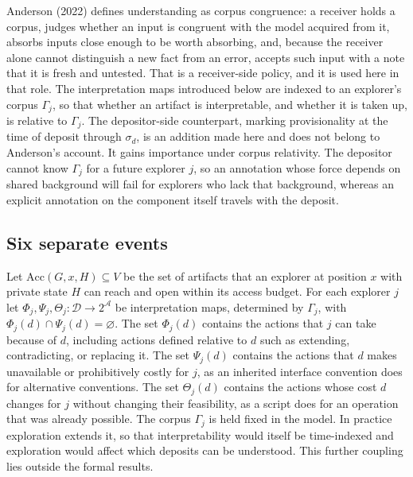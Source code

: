 \documentclass[11pt]{article}
\theoremstyle{definition}
\theoremstyle{remark}
\newcommand{\Acc}{\mathrm{Acc}}
\begin{document}
Anderson (2022) defines understanding as corpus congruence: a receiver holds a corpus, judges whether an input is congruent with the model acquired from it, absorbs inputs close enough to be worth absorbing, and, because the receiver alone cannot distinguish a new fact from an error, accepts such input with a note that it is fresh and untested. That is a receiver-side policy, and it is used here in that role. The interpretation maps introduced below are indexed to an explorer's corpus $\Gamma_j$, so that whether an artifact is interpretable, and whether it is taken up, is relative to $\Gamma_j$. The depositor-side counterpart, marking provisionality at the time of deposit through $\sigma_d$, is an addition made here and does not belong to Anderson's account. It gains importance under corpus relativity. The depositor cannot know $\Gamma_j$ for a future explorer $j$, so an annotation whose force depends on shared background will fail for explorers who lack that background, whereas an explicit annotation on the component itself travels with the deposit.

\subsection{Six separate events}

Let $\Acc(G,x,H)\subseteq V$ be the set of artifacts that an explorer at position $x$ with private state $H$ can reach and open within its access budget. For each explorer $j$ let $\Phi_j,\Psi_j,\Theta_j:\mathcal{D}\to 2^{\mathcal{A}}$ be interpretation maps, determined by $\Gamma_j$, with $\Phi_j(d)\cap\Psi_j(d)=\varnothing$. The set $\Phi_j(d)$ contains the actions that $j$ can take because of $d$, including actions defined relative to $d$ such as extending, contradicting, or replacing it. The set $\Psi_j(d)$ contains the actions that $d$ makes unavailable or prohibitively costly for $j$, as an inherited interface convention does for alternative conventions. The set $\Theta_j(d)$ contains the actions whose cost $d$ changes for $j$ without changing their feasibility, as a script does for an operation that was already possible. The corpus $\Gamma_j$ is held fixed in the model. In practice exploration extends it, so that interpretability would itself be time-indexed and exploration would affect which deposits can be understood. This further coupling lies outside the formal results.
\end{document}
